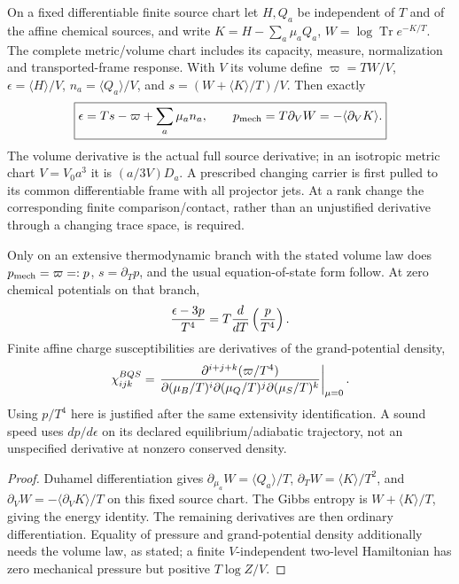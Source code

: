 \documentclass[12pt,a4paper]{article}
\begin{document}
\begin{theorem}
\label{p11:thm:native-thermodynamic-response-bridge}
On a fixed differentiable finite source chart let $H,Q_a$ be independent of
$T$ and of the affine chemical sources, and write
$K=H-\sum_a\mu_aQ_a$, $W=\log\operatorname{Tr}e^{-K/T}$.
The complete metric/volume chart includes its capacity, measure, normalization
and transported-frame response. With $V$ its volume define
$\varpi=TW/V$, $\epsilon=\langle H\rangle/V$, $n_a=\langle Q_a\rangle/V$,
and $s=(W+\langle K\rangle/T)/V$. Then exactly
\begin{equation}
\label{p11:eq:thermal-response-basic}
 \boxed{\epsilon=Ts-\varpi+\sum_a\mu_an_a,\qquad
 p_{\rm mech}=T\partial_VW=-\langle\partial_VK\rangle.}
\end{equation}
The volume derivative is the actual full source derivative; in an isotropic
metric chart $V=V_0a^3$ it is $(a/3V)D_a$. A prescribed changing carrier is
first pulled to its common differentiable frame with all projector jets.
At a rank change the corresponding finite comparison/contact, rather than
an unjustified derivative through a changing trace space, is required.

Only on an extensive thermodynamic branch with the stated volume law does
$p_{\rm mech}=\varpi=:p$, $s=\partial_Tp$, and the usual equation-of-state
form follow. At zero chemical potentials on that branch,
\begin{equation}
\label{p11:eq:thermal-trace-anomaly-response}
 {\epsilon-3p\over T^4}=T{d\over dT}\left({p\over T^4}\right).
\end{equation}
Finite affine charge susceptibilities are derivatives of the grand-potential
density,
\begin{equation}
\label{p11:eq:bqs-susceptibilities}
 \chi_{ijk}^{BQS}=\left.
 {\partial^{i+j+k}(\varpi/T^4)\over
 \partial(\mu_B/T)^i\partial(\mu_Q/T)^j\partial(\mu_S/T)^k}
 \right|_{\mu=0}.
\end{equation}
Using $p/T^4$ here is justified after the same extensivity identification.
A sound speed uses $dp/d\epsilon$ on its declared equilibrium/adiabatic
trajectory, not an unspecified derivative at nonzero conserved density.
\end{theorem}
\begin{proof}
Duhamel differentiation gives $\partial_{\mu_a}W=\langle Q_a\rangle/T$,
$\partial_TW=\langle K\rangle/T^2$, and
$\partial_VW=-\langle\partial_VK\rangle/T$ on this fixed source chart.
The Gibbs entropy is $W+\langle K\rangle/T$, giving the energy identity.
The remaining derivatives are then ordinary differentiation. Equality of
pressure and grand-potential density additionally needs the volume law,
as stated; a finite $V$-independent two-level Hamiltonian has zero mechanical
pressure but positive $T\log Z/V$.
\end{proof}
\end{document}
